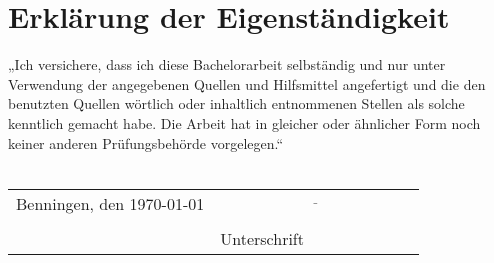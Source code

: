 \newpage
\thispagestyle{plain}
\chapter*{Erklärung der Eigenständigkeit}
\makeatletter %
„Ich versichere, dass ich diese Bachelorarbeit selbständig und nur unter Verwendung der angegebenen Quellen und Hilfsmittel angefertigt und die den benutzten Quellen wörtlich oder inhaltlich entnommenen Stellen als solche kenntlich gemacht habe. Die Arbeit hat in gleicher oder ähnlicher Form noch keiner anderen Prüfungsbehörde vorgelegen.“\\
\vspace{3em}\\
\begin{tabular}{@{}l l}
	\noindent
	Benningen, den \today &\hspace{1cm} $\underline{\hspace{5cm}}$\\
	&\hspace{1cm} \@author\\
	&\hspace{1cm} {\scriptsize Unterschrift}
\end{tabular}
\vspace{4cm}
